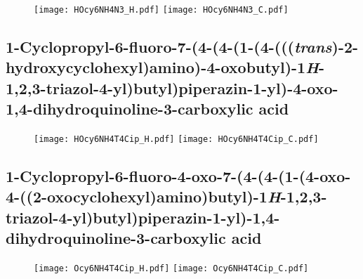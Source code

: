 \begin{figure}[H]
	\centering
		\texttt{[image: HOcy6NH4N3\_H.pdf]}
		\texttt{[image: HOcy6NH4N3\_C.pdf]}
\end{figure}



\subsection{1\hyp{}Cyclopropyl\hyp{}6\hyp{}fluoro\hyp{}7\hyp{}(4\hyp{}(4\hyp{}(1\hyp{}(4\hyp{}(((\textit{trans})\hyp{}2\hyp{}hydroxycyclohexyl)amino)\hyp{}4\hyp{}oxobutyl)\hyp{}1\textit{H}\hyp{}1,2,3\hyp{}triazol\hyp{}4\hyp{}yl)butyl)piperazin\hyp{}1\hyp{}yl)\hyp{}4\hyp{}oxo\hyp{}1,4\hyp{}dihydroquinoline\hyp{}3\hyp{}carboxylic acid }

\begin{figure}[H]
	\centering
		\texttt{[image: HOcy6NH4T4Cip\_H.pdf]}
		\texttt{[image: HOcy6NH4T4Cip\_C.pdf]}
\end{figure}

\subsection{1\hyp{}Cyclopropyl\hyp{}6\hyp{}fluoro\hyp{}4\hyp{}oxo\hyp{}7\hyp{}(4\hyp{}(4\hyp{}(1\hyp{}(4\hyp{}oxo\hyp{}4\hyp{}((2\hyp{}oxocyclohexyl)amino)butyl)\hyp{}1\textit{H}\hyp{}1,2,3\hyp{}triazol\hyp{}4\hyp{}yl)butyl)piperazin\hyp{}1\hyp{}yl)\hyp{}1,4\hyp{}dihydroquinoline\hyp{}3\hyp{}carboxylic acid }

\begin{figure}[H]
	\centering
		\texttt{[image: Ocy6NH4T4Cip\_H.pdf]}
		\texttt{[image: Ocy6NH4T4Cip\_C.pdf]}
\end{figure}
